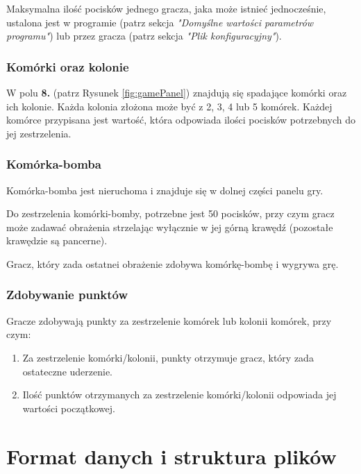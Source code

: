 \documentclass[a4paper]{article}
\begin{document}
Maksymalna ilość pocisk\'ow jednego gracza, jaka mo\.ze istnie\'c jednocze\'snie, ustalona jest w programie (patrz sekcja \textit{"Domy\'slne warto\'sci parametr\'ow programu"}) lub przez gracza (patrz sekcja \textit{"Plik konfiguracyjny"}).

\subsubsection{Kom\'orki oraz kolonie}
\quad W polu \textbf{8.} (patrz Rysunek \ref{fig:gamePanel}) znajduj\k{a} si\k{e} spadaj\k{a}ce kom\'orki oraz ich kolonie.
Ka\.zda kolonia z\l{}o\.zona mo\.ze by\'c z 2, 3, 4 lub 5 kom\'orek. Ka\.zdej kom\'orce przypisana jest warto\'s\'c, kt\'ora odpowiada ilo\'sci pocisk\'ow potrzebnych do jej zestrzelenia.

\subsubsection{Kom\'orka-bomba}
\quad Kom\'orka-bomba jest nieruchoma i znajduje si\k{e} w dolnej cz\k{e}\'sci panelu gry. 

Do zestrzelenia kom\'orki-bomby, potrzebne jest 50 pocisk\'ow, przy czym gracz mo\.ze zadawa\'c obra\.zenia strzelaj\k{a}c wy\l{}\k{a}cznie w jej g\'orn\k{a} kraw\k{e}d\'z (pozosta\l{}e kraw\k{e}dzie s\k{a} pancerne).

Gracz, kt\'ory zada ostatnei obra\.zenie zdobywa kom\'ork\k{e}-bomb\k{e} i wygrywa gr\k{e}.

\subsubsection{Zdobywanie punkt\'ow}
\quad Gracze zdobywaj\k{a} punkty za zestrzelenie kom\'orek lub kolonii kom\'orek, przy czym:
\begin{enumerate}
    \item Za zestrzelenie kom\'orki/kolonii, punkty otrzymuje gracz, kt\'ory zada ostateczne uderzenie.
    \item Ilo\'s\'c punkt\'ow otrzymanych za zestrzelenie kom\'orki/kolonii odpowiada jej warto\'sci pocz\k{a}tkowej.
\end{enumerate}






\section{Format danych i struktura plik\'ow}
\end{document}
